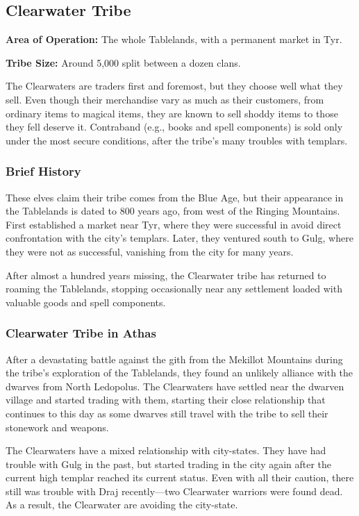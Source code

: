 \subsection{Clearwater Tribe}
\textbf{Area of Operation:} The whole Tablelands, with a permanent market in Tyr.

\textbf{Tribe Size:} Around 5,000 split between a dozen clans.

The Clearwaters are traders first and foremost, but they choose well what they sell. Even though their merchandise vary as much as their customers, from ordinary items to magical items, they are known to sell shoddy items to those they fell deserve it. Contraband (e.g., books and spell components) is sold only under the most secure conditions, after the tribe's many troubles with templars.

\subsubsection{Brief History}
These elves claim their tribe comes from the Blue Age, but their appearance in the Tablelands is dated to 800 years ago, from west of the Ringing Mountains. First established a market near Tyr, where they were successful in avoid direct confrontation with the city's templars. Later, they ventured south to Gulg, where they were not as successful, vanishing from the city for many years.

After almost a hundred years missing, the Clearwater tribe has returned to roaming the Tablelands, stopping occasionally near any settlement loaded with valuable goods and spell components.

\subsubsection{Clearwater Tribe in Athas}
After a devastating battle against the gith from the Mekillot Mountains during the tribe's exploration of the Tablelands, they found an unlikely alliance with the dwarves from North Ledopolus. The Clearwaters have settled near the dwarven village and started trading with them, starting their close relationship that continues to this day as some dwarves still travel with the tribe to sell their stonework and weapons.

The Clearwaters have a mixed relationship with city-states. They have had trouble with Gulg in the past, but started trading in the city again after the current high templar reached its current status. Even with all their caution, there still was trouble with Draj recently---two Clearwater warriors were found dead. As a result, the Clearwater are avoiding the city-state.

